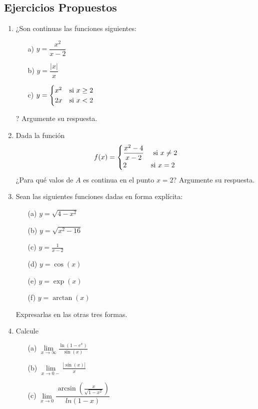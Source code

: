 \documentclass[10pt,twoside]{SelfArx} %
\begin{document}
\subsection{Ejercicios Propuestos}
\begin{enumerate}
	\item	¿Son continuas las funciones siguientes: %
		\begin{enumerate}
			\item[a)] $ y=\dfrac{x^{2}}{x-2} $
			\item[b)] $ y=\dfrac{|x|}{x} $
			\item[c)] $ y=\begin{cases}
			x^{2} & \hbox{si $ x\geq2 $}\\
			2x & \hbox{si $ x<2 $}
			\end{cases} $
		\end{enumerate}
		? Argumente su respuesta.
	\item Dada la función  %
	\[ f(x)=\begin{cases}
	\dfrac{x^{2}-4}{x-2} & \hbox{ si $ x\neq2 $}\\
	2 & \hbox{si $ x=2 $}
	\end{cases}
	 \]
	 ¿Para qué valos de $ A $ es continua en el punto $ x=2 $? Argumente su respuesta.
	\item	Sean las siguientes funciones dadas en forma expl\'icita:	%
		\begin{enumerate}
			\item[(a)]	$ y=\sqrt{4-x^{2}} $
			\item[(b)]	$ y=\sqrt{x^{2}-16} $
			\item[(c)]	$ y=\frac{1}{x-2} $
			\item[(d)]	$ y=\cos(x) $
			\item[(e)]	$ y=\exp(x) $
			\item[(f)]	$ y=\arctan(x) $
		\end{enumerate}
		Expresarlas en las otras tres formas.
	\item	Calcule %
		\begin{enumerate}
			\item[(a)]	$ \lim\limits_{x\rightarrow\infty}\frac{\ln(1-e^{x})}{\sin(x)} $
			\item[(b)]	$ \lim\limits_{x\rightarrow0-}\frac{|\sin(x)|}{x} $
			\item[(c)]	$ \lim\limits_{x\rightarrow0}\dfrac{\arcsin(\frac{x}{\sqrt{1-x^{2}}})}{ln(1-x)} $
			

\end{enumerate}
\end{enumerate}
\end{document}
